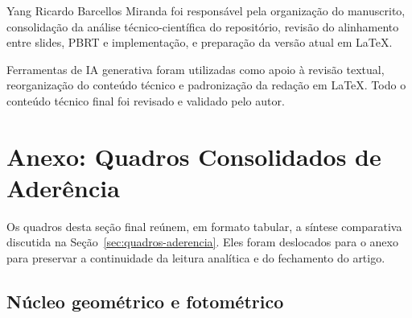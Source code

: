 \documentclass[portuguese]{sbcreviews-2025}%
\begin{document}
\begin{declarations}

\begin{contributions}
Yang Ricardo Barcellos Miranda foi responsável pela organização do manuscrito, consolidação da análise técnico-científica do repositório, revisão do alinhamento entre slides, PBRT e implementação, e preparação da versão atual em \LaTeX.
\end{contributions}

\begin{aitools}
Ferramentas de IA generativa foram utilizadas como apoio à revisão textual, reorganização do conteúdo técnico e padronização da redação em \LaTeX. Todo o conteúdo técnico final foi revisado e validado pelo autor.
\end{aitools}

\end{declarations}




\clearpage
\section*{Anexo: Quadros Consolidados de Aderência}

Os quadros desta seção final reúnem, em formato tabular, a síntese comparativa discutida na Seção~\ref{sec:quadros-aderencia}. Eles foram deslocados para o anexo para preservar a continuidade da leitura analítica e do fechamento do artigo.

\subsection*{Núcleo geométrico e fotométrico}
\end{document}

